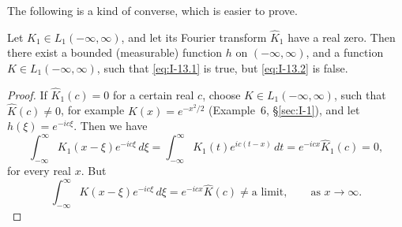 The following is a kind of converse, which is easier to prove.

\begin{theorem}\label{thm:I-25}
Let $K_1\in L_1(-\infty,\infty)$, and let its Fourier transform $\widehat K_1$ have a real zero. Then there exist a bounded (measurable) function $h$ on $(-\infty,\infty)$, and a function $K\in L_1(-\infty,\infty)$, such that \eqref{eq:I-13.1} is true, but \eqref{eq:I-13.2} is false.
\end{theorem}

\begin{proof}
If $\widehat K_1(c)=0$ for a certain real $c$, choose $K\in L_1(-\infty,\infty)$, such that $\widehat K(c)\neq 0$, for example $K(x)=e^{-x^{2}/2}$ (Example~6, \S\ref{sec:I-1}), and let $h(\xi)=e^{-ic\xi}$. Then we have
\begin{equation*}
\int_{-\infty}^{\infty}K_1(x-\xi)e^{-ic\xi}\,d\xi
=\int_{-\infty}^{\infty}K_1(t)e^{ic(t-x)}\,dt
=e^{-icx}\widehat K_1(c)=0,
\end{equation*}
for every real $x$. But
\begin{equation*}
\int_{-\infty}^{\infty}K(x-\xi)e^{-ic\xi}\,d\xi
=e^{-icx}\widehat K(c)\neq\text{a limit},\qquad\text{as }x\to\infty.
\end{equation*}
\end{proof}

